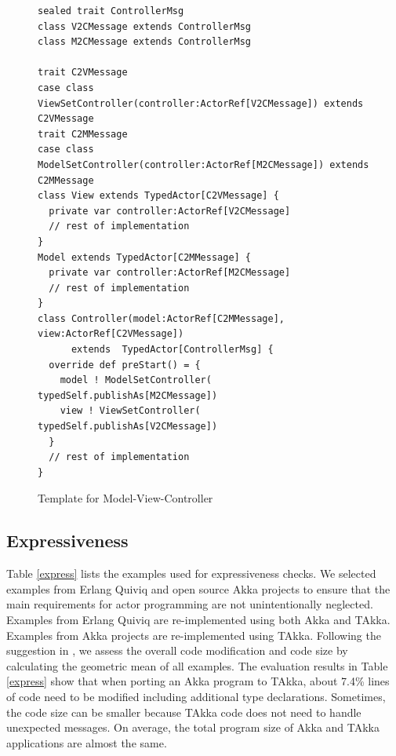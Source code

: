 \begin{figure}[h]
\label{MVC}
\begin{lstlisting}
sealed trait ControllerMsg
class V2CMessage extends ControllerMsg
class M2CMessage extends ControllerMsg

trait C2VMessage
case class ViewSetController(controller:ActorRef[V2CMessage]) extends 
C2VMessage
trait C2MMessage
case class ModelSetController(controller:ActorRef[M2CMessage]) extends 
C2MMessage
class View extends TypedActor[C2VMessage] {
  private var controller:ActorRef[V2CMessage]
  // rest of implementation
}
Model extends TypedActor[C2MMessage] {
  private var controller:ActorRef[M2CMessage]
  // rest of implementation
}
class Controller(model:ActorRef[C2MMessage], view:ActorRef[C2VMessage]) 
      extends  TypedActor[ControllerMsg] {
  override def preStart() = {
    model ! ModelSetController( typedSelf.publishAs[M2CMessage])
    view ! ViewSetController( typedSelf.publishAs[V2CMessage])
  }
  // rest of implementation
}
\end{lstlisting}
\caption{Template for Model-View-Controller}
\end{figure}



\subsection{Expressiveness}
\label{expressiveness}
Table \ref{express} lists the examples used for expressiveness checks.  
We selected examples from Erlang Quiviq \citep{quviq}
and open source Akka projects to ensure that the main requirements for actor 
programming are not unintentionally neglected.  Examples from Erlang 
Quiviq are re-implemented using both Akka and TAkka.  Examples from 
Akka projects are re-implemented using TAkka.  Following the suggestion in  
\citep{HePa06}, we assess the overall code modification and code 
size by calculating the geometric mean of all examples. The evaluation results 
in Table \ref{express} show that when porting an Akka program to TAkka, about 
7.4\% lines of code need to be modified including additional type declarations. 
Sometimes, the code size can be smaller because TAkka code does not 
need to handle unexpected messages.  On average, the total program size 
of Akka and TAkka applications are almost the same.





